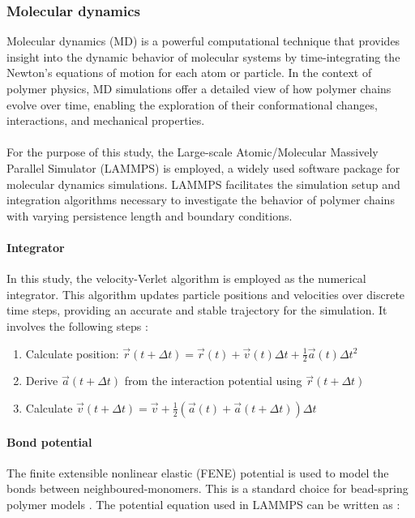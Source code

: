 \documentclass[
    paper=A4,pagesize=automedia,fontsize=12pt,
    BCOR=15mm,DIV=22,
    twoside,headinclude,footinclude=false,
    fleqn,             %
    bibliography=totocnumbered,          %
    listof=totoc,                %
    listof=flat,                 %
    cleardoublepage=empty      %
    numbers=endperiod
]{scrartcl}
\begin{document}
\subsubsection{Molecular dynamics}
Molecular dynamics (MD) is a powerful computational technique that
provides insight into the dynamic behavior of molecular systems by 
time-integrating the Newton's equations of motion for each atom or particle. 
In the context of polymer physics, MD simulations offer a detailed view of how polymer chains evolve over time, enabling the exploration of their conformational changes, interactions, and mechanical properties.
\\
\\
For the purpose of this study, the Large-scale Atomic/Molecular Massively
Parallel Simulator (LAMMPS) \cite{LAMMPS} is employed, a widely used software package 
for molecular dynamics simulations. LAMMPS facilitates the simulation setup and 
integration algorithms necessary to investigate the behavior of 
polymer chains with varying persistence length and boundary conditions.

\paragraph{Integrator}
In this study, the velocity-Verlet algorithm is employed as the numerical integrator. 
This algorithm updates particle positions and velocities over discrete time steps,
providing an accurate and stable trajectory for the simulation.
It involves the following steps \cite{10.1063/1.442716}:
\begin{enumerate}
    \item Calculate position: $\vec{r}(t+\Delta t) = \vec{r}(t) + \vec{v}(t) \Delta t + \frac{1}{2} \vec{a}(t) \Delta{t}^2$
    \item Derive $\vec{a}(t+\Delta t)$ from the interaction potential using $\vec{r}(t+\Delta t)$
    \item Calculate $\vec{v}(t+\Delta t) = \vec{v} + \frac{1}{2}(\vec{a}(t) + \vec{a}(t+\Delta t))\Delta t$ 
\end{enumerate}

\paragraph{Bond potential}
\label{par:bond_potential}
The finite extensible nonlinear elastic (FENE) potential \cite{Kremer_ChemPhys} 
is used to model the bonds between neighboured-monomers. This is a standard 
choice for bead-spring polymer models \cite{LAMMPS}. The potential equation used in
LAMMPS can be written as \cite{LAMMPS}:
\end{document}

